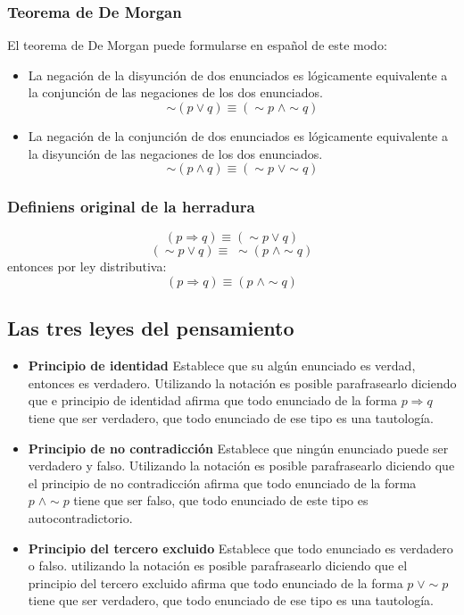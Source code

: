 \documentclass[10pt]{book} 						%
\begin{document}
\subsubsection{Teorema de De Morgan}
El teorema de De Morgan puede formularse en español de este modo:
\begin{itemize}
\item La negación de la disyunción de dos enunciados es lógicamente equivalente a la conjunción de las negaciones de los dos enunciados.
$$\sim (p \lor q)\equiv (\sim p \; \land \sim q)$$
\item La negación de la conjunción de dos enunciados es lógicamente equivalente a la disyunción de las negaciones de los dos enunciados.
$$ \sim (p \land q)\equiv(\sim p \; \lor \sim q) $$
\end{itemize}
\subsubsection{Definiens original de la herradura}
$$ (p \Rightarrow q)\equiv(\sim p \lor q) $$
$$ (\sim p \lor q)\equiv \; \sim (p  \; \land \sim q ) $$
entonces por ley distributiva:
$$ (p \Rightarrow q)\equiv(p  \; \land \sim q) $$

\subsection{Las tres leyes del pensamiento}
\begin{itemize}
\item \textbf{Principio de identidad} Establece que su algún enunciado es verdad, entonces es verdadero. Utilizando la notación es posible parafrasearlo diciendo que e principio de identidad afirma que todo enunciado de la forma $p \Rightarrow q$ tiene que ser verdadero, que todo enunciado de ese tipo es una tautología.
\item \textbf{Principio de no contradicción} Establece que ningún enunciado puede ser verdadero y falso. Utilizando la notación es posible parafrasearlo diciendo que el principio de no contradicción afirma que todo enunciado de la forma $p \; \land \sim p$ tiene que ser falso, que todo enunciado de este tipo es autocontradictorio.
\item \textbf{Principio del tercero excluido} Establece que todo enunciado es verdadero o falso. utilizando la notación es posible parafrasearlo diciendo que el principio del tercero excluido afirma que todo enunciado de la forma $p \; \lor \sim p$ tiene que ser verdadero, que todo enunciado de ese tipo es una tautología.
\end{itemize}
\end{document}
